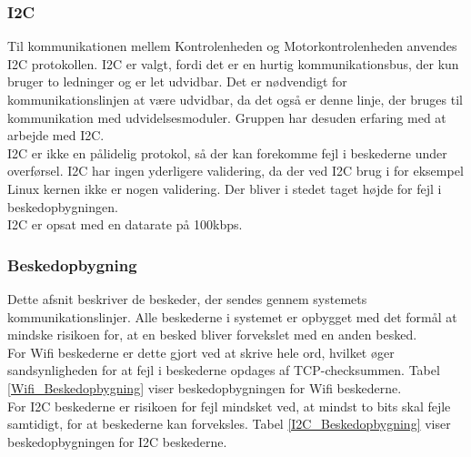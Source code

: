 \newpage
\subsubsection{I2C}
Til kommunikationen mellem Kontrolenheden og Motorkontrolenheden anvendes I2C protokollen. 
I2C er valgt, fordi det er en hurtig kommunikationsbus, der kun bruger to ledninger og er let udvidbar. 
Det er nødvendigt for kommunikationslinjen at være udvidbar, da det også er denne linje, der bruges til kommunikation med udvidelsesmoduler. 
Gruppen har desuden erfaring med at arbejde med I2C.\\
I2C er ikke en pålidelig protokol, så der kan forekomme fejl i beskederne under overførsel. 
I2C har ingen yderligere validering, da der ved I2C brug i for eksempel Linux kernen ikke er nogen validering.
Der bliver i stedet taget højde for fejl i beskedopbygningen.\\ 
I2C er opsat med en datarate på 100kbps.


\subsubsection{Beskedopbygning}
Dette afsnit beskriver de beskeder, der sendes gennem systemets kommunikationslinjer. 
Alle beskederne i systemet er opbygget med det formål at mindske risikoen for, at en besked bliver forvekslet med en anden besked.  \\
For Wifi beskederne er dette gjort ved at skrive hele ord, hvilket øger sandsynligheden for at fejl i beskederne opdages af TCP-checksummen.
Tabel \ref{Wifi_Beskedopbygning} viser beskedopbygningen for Wifi beskederne.\\
For I2C beskederne er risikoen for fejl mindsket ved, at mindst to bits skal fejle samtidigt, for at beskederne kan forveksles.
Tabel \ref{I2C_Beskedopbygning} viser beskedopbygningen for I2C beskederne.


